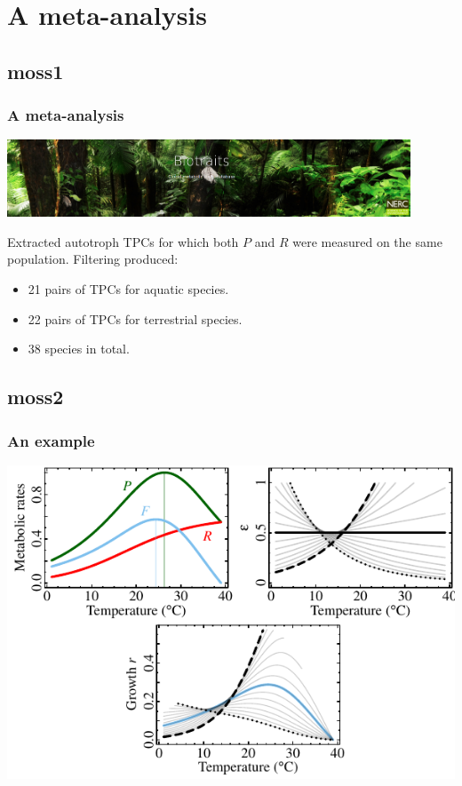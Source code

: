 \documentclass{beamer}
\begin{document}
\section{A meta-analysis}

\subsection{moss1}
\begin{frame}
  \frametitle{A meta-analysis}

  \vspace{-20pt}

  \begin{center}
    \includegraphics[width=0.9\textwidth]{figs/biotraits.png}
  \end{center}

  \vspace{10pt}

  Extracted autotroph TPCs for which both $P$ and $R$ were measured on the same
  population. Filtering produced:
  \begin{itemize}
    \item 21 pairs of TPCs for aquatic species.
    \item 22 pairs of TPCs for terrestrial species.
    \item 38 species in total. 
  \end{itemize}

\end{frame}



\subsection{moss2}
\begin{frame}
  \frametitle{An example}

  \begin{center}
    \includegraphics{figs/example_intro_pres.pdf}
  \end{center}
\end{frame}
\end{document}
